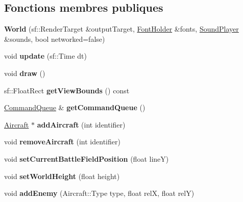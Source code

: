 \subsection*{Fonctions membres publiques}
\begin{DoxyCompactItemize}
\item 
\hypertarget{class_world_a18cb19e07500188f70f6cb188c71d816}{}\label{class_world_a18cb19e07500188f70f6cb188c71d816} 
{\bfseries World} (sf\+::\+Render\+Target \&output\+Target, \hyperlink{class_resource_holder}{Font\+Holder} \&fonts, \hyperlink{class_sound_player}{Sound\+Player} \&sounds, bool networked=false)
\item 
\hypertarget{class_world_ac7b3a3923c95b812ec2d00d97c8cd56e}{}\label{class_world_ac7b3a3923c95b812ec2d00d97c8cd56e} 
void {\bfseries update} (sf\+::\+Time dt)
\item 
\hypertarget{class_world_ab51a17ccbb108616daacd0c34973dc8d}{}\label{class_world_ab51a17ccbb108616daacd0c34973dc8d} 
void {\bfseries draw} ()
\item 
\hypertarget{class_world_a2dd90d4c7f83c60a3a84fe5858489c14}{}\label{class_world_a2dd90d4c7f83c60a3a84fe5858489c14} 
sf\+::\+Float\+Rect {\bfseries get\+View\+Bounds} () const
\item 
\hypertarget{class_world_af224b413f30c86ec99d042d0f4df56ee}{}\label{class_world_af224b413f30c86ec99d042d0f4df56ee} 
\hyperlink{class_command_queue}{Command\+Queue} \& {\bfseries get\+Command\+Queue} ()
\item 
\hypertarget{class_world_a4b5a1ee9561c00df5a3348b43ed9f6d9}{}\label{class_world_a4b5a1ee9561c00df5a3348b43ed9f6d9} 
\hyperlink{class_aircraft}{Aircraft} $\ast$ {\bfseries add\+Aircraft} (int identifier)
\item 
\hypertarget{class_world_a91c28f4442bd6383cfe373d60acf8207}{}\label{class_world_a91c28f4442bd6383cfe373d60acf8207} 
void {\bfseries remove\+Aircraft} (int identifier)
\item 
\hypertarget{class_world_a37e200069581c4ebdc5b4d4b2ac739fc}{}\label{class_world_a37e200069581c4ebdc5b4d4b2ac739fc} 
void {\bfseries set\+Current\+Battle\+Field\+Position} (float lineY)
\item 
\hypertarget{class_world_a2e0f3b87ccc0ec679e4704b05f3cd89c}{}\label{class_world_a2e0f3b87ccc0ec679e4704b05f3cd89c} 
void {\bfseries set\+World\+Height} (float height)
\item 
\hypertarget{class_world_a85839af0a06ddd4a7707119f825c4662}{}\label{class_world_a85839af0a06ddd4a7707119f825c4662} 
void {\bfseries add\+Enemy} (Aircraft\+::\+Type type, float relX, float relY)

\end{DoxyCompactItemize}
